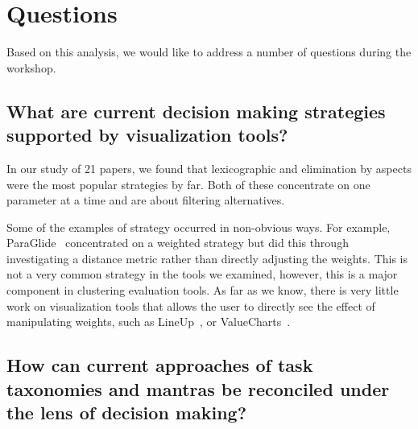 
\section{Questions}\label{questions}

Based on this analysis, we would like to address a number of questions during the workshop.

\subsection{What are current decision making strategies supported by visualization tools?}

In our study of 21 papers, we found that lexicographic and elimination by aspects were the most popular strategies
by far. Both of these concentrate on one parameter at a time and are
about filtering alternatives.

Some of the examples of strategy occurred in non-obvious ways.  For example,
ParaGlide~\citep{Bergner:2013} concentrated on a
weighted strategy but did this through
investigating a distance metric rather than directly adjusting the
weights. This is not a very common strategy in the tools we examined, however,
this is a major component in clustering evaluation tools.
As far as we know, there is 
very little work on visualization tools that allows the user to directly see the
effect of manipulating weights, such as LineUp~\citep{Gratzl:2013}, or 
ValueCharts~\citep{Carenini:2004}.




\subsection{How can current approaches of task taxonomies and mantras be reconciled under the lens of decision making?}

